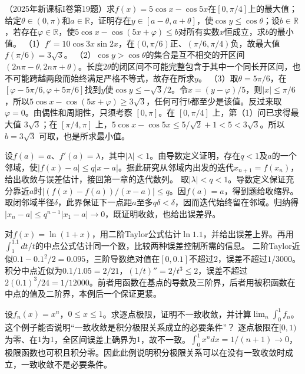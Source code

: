 （2025年新课标I卷第19题）求\(f(x)=5\cos x-\cos5x\)在\([0,\pi/4]\)上的最大值；给定\(\theta\in(0,\pi)\)和\(a\in\mathbb R\)，证明存在\(y\in[a-\theta,a+\theta]\)，使\(\cos y\le\cos\theta\)；设\(b\in\mathbb R\)，若存在\(\varphi\in\mathbb R\)，使\(5\cos x-\cos(5x+\varphi)\le b\)对所有实数\(x\)恒成立，求\(b\)的最小值。
\solutionanswer
（1）\(f'=10\cos3x\sin2x\)，在\((0,\pi/6)\)正、\((\pi/6,\pi/4)\)负，故最大值\(f(\pi/6)=3\sqrt3\)。
（2）\(\cos y>\cos\theta\)的集合是互不相交的开区间\((2n\pi-\theta,2n\pi+\theta)\)。长度\(2\theta\)的闭区间不可能完整包含于其中一个同长开区间，也不可能跨越两段而始终满足严格不等式，故存在所求\(y\)。
（3）取\(\theta=5\pi/6\)，在\([\varphi-5\pi/6,\varphi+5\pi/6]\)找到\(y\)使\(\cos y\le-\sqrt3/2\)。令\(x=(y-\varphi)/5\)，则\(|x|\le\pi/6\)，所以\(5\cos x-\cos(5x+\varphi)\ge3\sqrt3\)，任何可行\(b\)都至少是该值。反过来取 \(\varphi=0\)。由偶性和周期性，只须考察 \([0,\pi]\)。在 \([0,\pi/4]\) 上，第（1）问已求得最大值 \(3\sqrt3\)；在 \([\pi/4,\pi]\) 上，\(5\cos x-\cos5x\le 5/\sqrt2+1<5<3\sqrt3\)。所以 \(b=3\sqrt3\) 可取，也是所求最小值。


设\(f(a)=a\)、\(f'(a)=\lambda\)，其中\(|\lambda|<1\)。由导数定义证明，存在\(q<1\)及\(a\)的一个邻域，使\(|f(x)-a|\le q|x-a|\)。据此研究从邻域内出发的迭代\(x_{n+1}=f(x_n)\)，给出收敛与误差估计，接回第一章的迭代数列。
\solutionanswer
取\(|\lambda|<q<1\)。导数定义保证充分靠近\(a\)时\(|(f(x)-f(a))/(x-a)|\le q\)。因\(f(a)=a\)，得到题给收缩界。取闭邻域半径\(\delta\)，此界保证下一点距\(a\)至多\(q\delta<\delta\)，因而迭代始终留在邻域。归纳得\(|x_n-a|\le q^{n-1}|x_1-a|\to0\)，既证明收敛，也给出误差界。


对\(f(x)=\ln(1+x)\)，用二阶Taylor公式估计\(\ln1.1\)，并给出误差上界。再用\(\int_1^{1.1}dt/t\)的中点公式估计同一个数，比较两种误差控制所需的信息。
\solutionanswer
二阶Taylor近似\(0.1-0.1^2/2=0.095\)，三阶导数绝对值在\([0,0.1]\)不超过\(2\)，误差不超过\(1/3000\)。积分中点近似为\(0.1/1.05=2/21\)，\((1/t)''=2/t^3\le2\)，误差不超过\(2(0.1)^3/24=1/12000\)。前者用函数在基点的导数及三阶界，后者用被积函数在中点的值及二阶界，本例后一个保证更紧。


设\(f_n(x)=x^n\)，\(0\le x\le1\)。求逐点极限，证明不一致收敛，并计算\(\lim_n\int_0^1 f_n\)。这个例子能否说明“一致收敛是积分极限关系成立的必要条件”？
\solutionanswer
逐点极限在\([0,1)\)为零、在\(1\)为\(1\)，全区间误差上确界为\(1\)，故不一致。\(\int_0^1x^n dx=1/(n+1)\to0\)，极限函数也可积且积分零。因此此例说明积分极限关系可以在没有一致收敛时成立，一致收敛不是必要条件。


